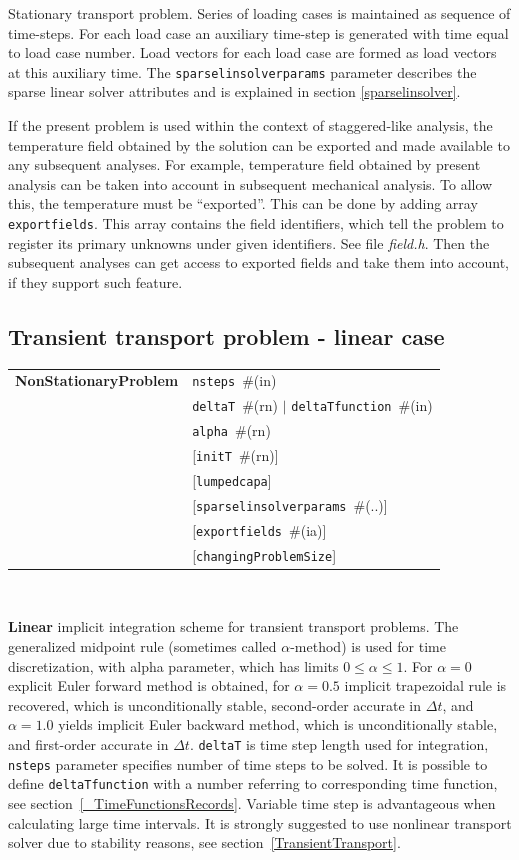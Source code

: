 \documentclass[a4paper]{article}
\makeatletter
\newcommand{\param}[1]{\texttt{#1}} %
\newcommand{\optional}[1]{[#1]} %
\newcommand{\field}[2]{\param{#1}~\#{\tiny(#2)}} %
\newcommand{\optField}[2]{\optional{\field{#1}{#2}}}
\newcommand{\optFieldnotype}[1]{[\param{#1}]}
\newcommand{\entKeywordInst}[1]{\textbf{#1}} %
\newenvironment{record}[1][]{\begin{tabular}{|ll}}{\end{tabular}\\}
\newcommand{\recentry}[2]{{#1}&{#2}\\}
\newcounter{rcc}
\newenvironment{record}[1][\textwidth]{\setcounter{rcc}{0}\begin{tabular*}{#1}{|ll@{\extracolsep{\fill}}r}}{\end{tabular*}\\}
\newcommand{\recentry}[2]{\ifthenelse{\value{rcc}>0}{&$\backslash$ \\}{\setcounter{rcc}{1}}{#1}&{#2}}
\makeatother
\begin{document}
Stationary transport problem.
Series of loading cases is maintained as sequence of time-steps.
For each load case an auxiliary time-step is generated with time
equal to load case number.
Load vectors for each load case are formed as load vectors at
this auxiliary time.
The  \param{sparselinsolverparams} parameter describes the sparse
linear solver attributes and is explained in section \ref{sparselinsolver}.

If the present problem is used within the context
of staggered-like analysis, the temperature field obtained by the
solution can be exported and made available to any subsequent
analyses. For example, temperature field obtained by present analysis
can be taken into account in subsequent mechanical analysis.
To allow this, the temperature must be ``exported''. This can be done
by adding array \param{exportfields}. This array contains the field
identifiers, which tell the problem to register its primary unknowns
under given identifiers. See file {\it field.h}.
Then the subsequent analyses can get access to exported fields 
and take them into account, if they support such feature.

\subsection{Transient transport problem - linear case}
\label{LinearTransientTransport}

\begin{record}
  \recentry{\entKeywordInst{NonStationaryProblem}}{\field{nsteps}{in}}
  \recentry{}{\field{deltaT}{rn} $|$ \field{deltaTfunction}{in}}
  \recentry{}{\field{alpha}{rn}}
  \recentry{}{\optField{initT}{rn}}
  \recentry{}{\optFieldnotype{lumpedcapa}}
  \recentry{}{\optField{sparselinsolverparams}{..}}
  \recentry{}{\optField{exportfields}{ia}}
  \recentry{}{\optFieldnotype{changingProblemSize}}
\end{record}

\textbf{Linear} implicit
integration scheme for transient transport problems. The generalized
midpoint rule (sometimes called $\alpha$-method) is used for time discretization, with alpha parameter,
which has limits $0\le\alpha\le1$. For $\alpha=0$ explicit Euler
forward method is obtained, for $\alpha=0.5$ implicit trapezoidal rule
is recovered, which is unconditionally stable, second-order accurate
in $\Delta t$, and $\alpha=1.0$ yields implicit Euler backward method,
which is unconditionally stable, and first-order accurate
in $\Delta t$. \param{deltaT} is time step length used for
integration, \param{nsteps} parameter specifies
number of time steps to be solved. It is possible to define \param{deltaTfunction}
with a number referring to corresponding time function, see section~\ref{_TimeFunctionsRecords}.
Variable time step is advantageous when calculating large time intervals. It is strongly suggested
to use nonlinear transport solver due to stability reasons, see section~\ref{TransientTransport}.
\end{document}
